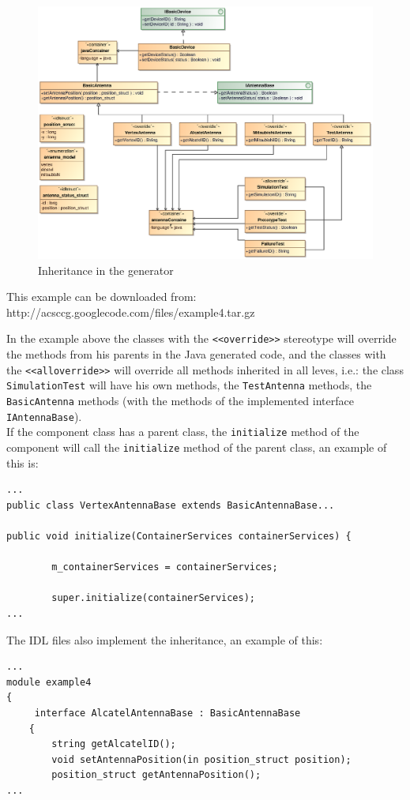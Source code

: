 \begin{figure}[h!t]
\begin{center}
\includegraphics[scale=0.88]{images/example4}
\caption{\label{fig:vs_diag}Inheritance in the generator}
\end{center}
\end{figure}

This example can be downloaded from:
http://acsccg.googlecode.com/files/example4.tar.gz

In the example above the classes with the  \verb+<<override>>+ stereotype will
override the methods from his parents in the Java generated code, and the
classes with the  \verb+<<alloverride>>+ will override all methods inherited in all
leves, i.e.: the class  \verb+SimulationTest+ will have his own methods, the 
\verb+TestAntenna+ methods, the  \verb+BasicAntenna+ methods (with the methods
of the implemented interface  \verb+IAntennaBase+).\\
If the component class has a parent class, the  \verb+initialize+ method of the
component will call the  \verb+initialize+ method of the parent class, an
example of this is:
\begin{center}
\begin{verbatim}
...
public class VertexAntennaBase extends BasicAntennaBase...

public void initialize(ContainerServices containerServices) {

		m_containerServices = containerServices;

		super.initialize(containerServices);
...
\end{verbatim}
\end{center}
The IDL files also implement the inheritance, an example of this:
\begin{center}
\begin{verbatim}
...
module example4
{
     interface AlcatelAntennaBase : BasicAntennaBase  
    {
        string getAlcatelID();
        void setAntennaPosition(in position_struct position);
        position_struct getAntennaPosition();
...
\end{verbatim}
\end{center}

